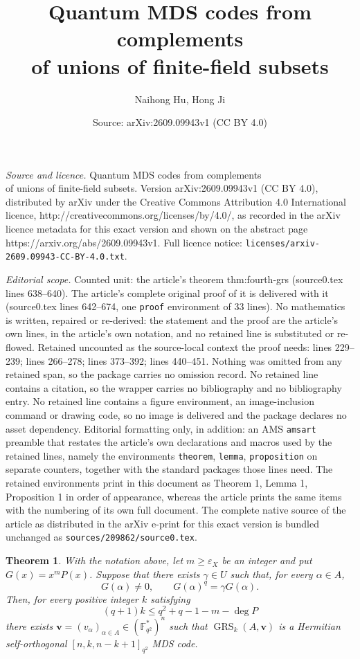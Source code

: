 \documentclass[10pt,a4paper]{amsart}
\title{Quantum MDS codes from complements\\of unions of finite-field subsets}
\author{Naihong Hu, Hong Ji}
\date{Source: arXiv:2609.09943v1 (CC BY 4.0)}
\newtheorem{theorem}{Theorem}
\newcommand{\GRS}{\operatorname{GRS}}
\begin{document}
\maketitle

\noindent\emph{Source and licence.} Quantum MDS codes from complements\\of unions of finite-field subsets. Version arXiv:2609.09943v1 (CC BY 4.0), distributed by arXiv under the Creative Commons Attribution 4.0 International licence, http://creativecommons.org/licenses/by/4.0/, as recorded in the arXiv licence metadata for this exact version and shown on the abstract page https://arxiv.org/abs/2609.09943v1. Full licence notice: \texttt{licenses/arxiv-2609.09943-CC-BY-4.0.txt}.\par\smallskip

\noindent\textit{Editorial scope.} Counted unit: the article's theorem thm:fourth-grs (source0.tex lines 638--640). The article's complete original proof of it is delivered with it (source0.tex lines 642--674, one \texttt{proof} environment of 33 lines). No mathematics is written, repaired or re-derived: the statement and the proof are the article's own lines, in the article's own notation, and no retained line is substituted or re-flowed.  Retained uncounted as the source-local context the proof needs: lines 229--239; lines 266--278; lines 373--392; lines 440--451.  Nothing was omitted from any retained span, so the package carries no omission record.  No retained line contains a citation, so the wrapper carries no bibliography and no bibliography entry.  No retained line contains a figure environment, an image-inclusion command or drawing code, so no image is delivered and the package declares no asset dependency.  Editorial formatting only, in addition: an AMS \texttt{amsart} preamble that restates the article's own declarations and macros used by the retained lines, namely the environments \texttt{theorem}, \texttt{lemma}, \texttt{proposition} on separate counters, together with the standard packages those lines need.  The retained environments print in this document as Theorem 1, Lemma 1, Proposition 1 in order of appearance, whereas the article prints the same items with the numbering of its own full document.  The complete native source of the article as distributed in the arXiv e-print for this exact version is bundled unchanged as \texttt{sources/209862/source0.tex}.
\begin{theorem}\label{thm:general-construction}
With the notation above, let $m\ge\varepsilon_X$ be an integer and put $G(x)=x^mP(x)$. Suppose that there exists $\gamma\in U$ such that, for every $\alpha\in A$,
\begin{equation}\label{eq:general-frobenius}
 G(\alpha)\ne0,\qquad G(\alpha)^q=\gamma G(\alpha).
\end{equation}
Then, for every positive integer $k$ satisfying
\begin{equation}\label{eq:general-degree}
 (q+1)k\le q^2+q-1-m-\deg P
\end{equation}
there exists $\boldsymbol v=(v_\alpha)_{\alpha\in A}\in(\mathbb F_{q^2}^{*})^n$ such that $\GRS_k(A,\boldsymbol v)$ is a Hermitian self-orthogonal \mbox{$[n,k,n-k+1]_{q^2}$} MDS code.
\end{theorem}
\end{document}
